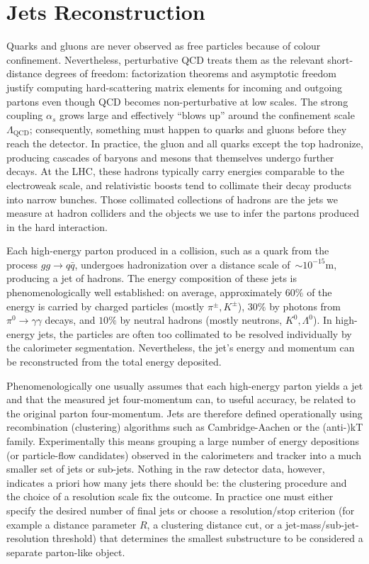 \section{Jets Reconstruction}\label{sec:jets}

Quarks and gluons are never observed as free particles because of colour confinement. Nevertheless, perturbative QCD treats them as the relevant short-distance degrees of freedom: factorization theorems and asymptotic freedom justify computing hard-scattering matrix elements for incoming and outgoing partons even though QCD becomes non-perturbative at low scales. The strong coupling $\alpha_s$ grows large and effectively ``blows up'' around the confinement scale $\Lambda_{\mathrm{QCD}}$; consequently, something must happen to quarks and gluons before they reach the detector. In practice, the gluon and all quarks except the top hadronize, producing cascades of baryons and mesons that themselves undergo further decays. At the LHC, these hadrons typically carry energies comparable to the electroweak scale, and relativistic boosts tend to collimate their decay products into narrow bunches. Those collimated collections of hadrons are the jets we measure at hadron colliders and the objects we use to infer the partons produced in the hard interaction.

Each high-energy parton produced in a collision, such as a quark from the process $gg \rightarrow q\bar{q}$, undergoes hadronization over a distance scale of~$\sim10^{-15}\mathrm{m}$, producing a jet of hadrons. The energy composition of these jets is phenomenologically well established: on average, approximately $60\%$ of the energy is carried by charged particles (mostly $\pi^{\pm}, K^{\pm}$), $30\%$ by photons from $\pi^0 \rightarrow \gamma\gamma$ decays, and $10\%$ by neutral hadrons (mostly neutrons, $K^0, \Lambda^0$). In high-energy jets, the particles are often too collimated to be resolved individually by the calorimeter segmentation. Nevertheless, the jet's energy and momentum can be reconstructed from the total energy deposited.

Phenomenologically one usually assumes that each high-energy parton yields a jet and that the measured jet four-momentum can, to useful accuracy, be related to the original parton four-momentum. Jets are therefore defined operationally using recombination (clustering) algorithms such as Cambridge-Aachen or the (anti-)kT family. Experimentally this means grouping a large number of energy depositions (or particle-flow candidates) observed in the calorimeters and tracker into a much smaller set of jets or sub-jets. Nothing in the raw detector data, however, indicates a priori how many jets there should be: the clustering procedure and the choice of a resolution scale fix the outcome. In practice one must either specify the desired number of final jets or choose a resolution/stop criterion (for example a distance parameter $R$, a clustering distance cut, or a jet-mass/sub-jet-resolution threshold) that determines the smallest substructure to be considered a separate parton-like object.

